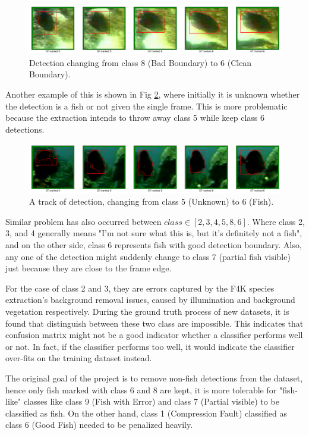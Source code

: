 \documentclass[bsc,logo,twoside,fullspacing,parskip]{infthesis}
\begin{document}
\begin{figure}[h]
\centering
    \includegraphics[scale=0.34]{graph/6-8.png}
    \caption{Detection changing from class 8 (Bad Boundary) to 6 (Clean Boundary).}
    \label{fig:class68}
\end{figure}

Another example of this is shown in Fig \ref{fig:class56}, where initially it is unknown whether the detection is a fish or not given the single frame. This is more problematic because the extraction intends to throw away class 5 while keep class 6 detections. 

\begin{figure}[ht]
\centering
    \includegraphics[scale=0.34]{graph/5-6.png}
    \caption{A track of detection, changing from class 5 (Unknown) to 6 (Fish).}
    \label{fig:class56}
\end{figure}

Similar problem has also occurred between \(class\in[2,3,4,5,8,6]\). Where class 2, 3, and 4 generally means "I'm not sure what this is, but it's definitely not a fish", and on the other side, class 6 represents fish with good detection boundary. 
Also, any one of the detection might suddenly change to class 7 (partial fish visible) just because they are close to the frame edge. 

For the case of class 2 and 3, they are errors captured by the F4K species extraction's background removal issues, caused by illumination and background vegetation respectively.
During the ground truth process of new datasets, it is found that distinguish between these two class are impossible.
This indicates that confusion matrix might not be a good indicator whether a classifier performs well or not. In fact, if the classifier performs too well, it would indicate the classifier over-fits on the training dataset instead.

The original goal of the project is to remove non-fish detections from the dataset, hence only fish marked with class 6 and 8 are kept, it is more tolerable for "fish-like" classes 
like class 9 (Fish with Error) and class 7 (Partial visible) to be classified as fish.
On the other hand, class 1 (Compression Fault) classified as class 6 (Good Fish) needed to be penalized heavily. 
\end{document}
